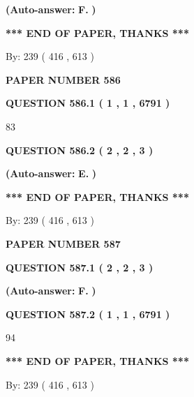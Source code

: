 \documentclass[12pt]{article}
\begin{document}
 
{\textbf{(Auto-answer:}}
{\textbf{\large{
F.}}}
{\textbf{)}}
 
 
   
   
   
   
\vspace{1.0in} 
{\textbf{\large{ *** END OF PAPER, THANKS *** }}} 
   
   
\hspace{1.0in} By: 
 239 ( 416 ,  613 )
   
   
   
   
\newpage 
\setcounter{page}{ 
   586001 } 
   
   
 {\textbf{ \Large{ PAPER NUMBER  586  }}}
   
   
   
   
  
  
{\textbf{\large{QUESTION
586.1 
 ( 1 , 1 , 6791 )
}}}

83
  
  
{\textbf{\large{QUESTION
586.2 
 ( 2 , 2 , 3 )
}}}
 
 
{\textbf{(Auto-answer:}}
{\textbf{\large{
E.}}}
{\textbf{)}}
 
 
   
   
   
   
\vspace{1.0in} 
{\textbf{\large{ *** END OF PAPER, THANKS *** }}} 
   
   
\hspace{1.0in} By: 
 239 ( 416 ,  613 )
   
   
   
   
\newpage 
\setcounter{page}{ 
   587001 } 
   
   
 {\textbf{ \Large{ PAPER NUMBER  587  }}}
   
   
   
   
  
  
{\textbf{\large{QUESTION
587.1 
 ( 2 , 2 , 3 )
}}}
 
 
{\textbf{(Auto-answer:}}
{\textbf{\large{
F.}}}
{\textbf{)}}
 
 
  
  
{\textbf{\large{QUESTION
587.2 
 ( 1 , 1 , 6791 )
}}}

94
   
   
   
   
\vspace{1.0in} 
{\textbf{\large{ *** END OF PAPER, THANKS *** }}} 
   
   
\hspace{1.0in} By: 
 239 ( 416 ,  613 )
   
   
   
\end{document}
